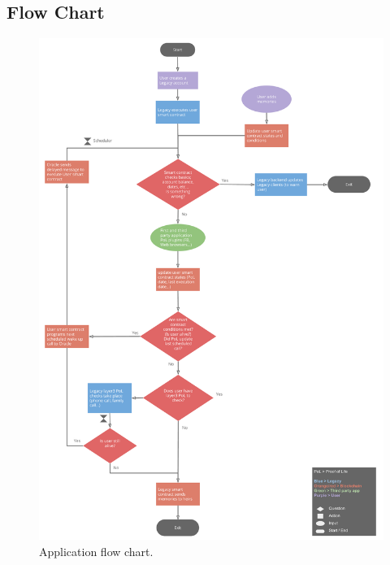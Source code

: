 \begin{appendices}
\chapter{Flow Chart} %
\label{cha:flow_chart}
\begin{figure}
	\centering
	\includegraphics[scale=0.4]{fig/flow_chart_short_version.pdf}
	\caption{Application flow chart.}
	\label{fig:flow_chart}
\end{figure}



\end{appendices}
